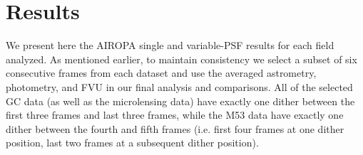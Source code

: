 \documentclass[]{spie}  %
\begin{document}

\section{Results} \label{sec:fvu-astrom-results}
We present here the AIROPA single and variable-PSF results for each field analyzed. As mentioned earlier, to maintain consistency we select a subset of six consecutive frames from each dataset and use the averaged astrometry, photometry, and FVU in our final analysis and comparisons. All of the selected GC data (as well as the microlensing data) have exactly one dither between the first three frames and last three frames, while the M53 data have exactly one dither between the fourth and fifth frames (i.e. first four frames at one dither position, last two frames at a subsequent dither position).
\end{document}
